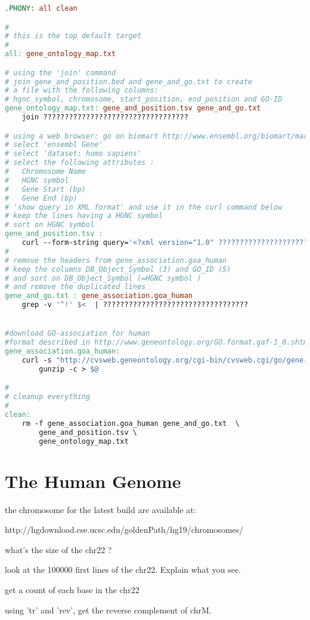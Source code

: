 \documentclass{article}
\begin{document}
\begin{lstlisting}[language=make]
.PHONY: all clean

#
# this is the top default target
#
all: gene_ontology_map.txt

# using the 'join' command
# join gene_and_position.bed and gene_and_go.txt to create 
# a file with the following columns:  
# hgnc_symbol, chromosome, start_position, end_position and GO-ID
gene_ontology_map.txt: gene_and_position.tsv gene_and_go.txt
	join ??????????????????????????????????

# using a web browser: go on biomart http://www.ensembl.org/biomart/martview/
# select 'ensembl Gene'
# select 'dataset: homo sapiens'
# select the following attributes : 
#	Chromosome Name
#	HGNC symbol 
#	Gene Start (bp)
#	Gene End (bp)
# 'show query in XML format' and use it in the curl command below
# keep the lines having a HGNC symbol
# sort on HGNC symbol 
gene_and_position.tsv : 
	curl --form-string query='<?xml version="1.0" ??????????????????????????????????
#
# remove the headers from gene_association.goa_human
# keep the columns DB_Object_Symbol (3) and GO_ID (5)
# and sort on DB_Object_Symbol (=HGNC symbol )
# and remove the duplicated lines
gene_and_go.txt : gene_association.goa_human
	grep -v '^!' $<  | ??????????????????????????????????


#download GO-association for human
#format described in http://www.geneontology.org/GO.format.gaf-1_0.shtml
gene_association.goa_human:
	curl -s "http://cvsweb.geneontology.org/cgi-bin/cvsweb.cgi/go/gene-associations/$@.gz?rev=HEAD" |\
		gunzip -c > $@

#
# cleanup everything
#
clean:
	rm -f gene_association.goa_human gene_and_go.txt  \
		gene_and_position.tsv \
		gene_ontology_map.txt
\end{lstlisting}


\section{The Human Genome}

the chromosome for the latest build are available at:

http://hgdownload.cse.ucsc.edu/goldenPath/hg19/chromosomes/

what's the size of the chr22 ?

look at the 100000 first lines of the chr22. Explain what you see.

get a count of each base in the chr22

using 'tr' and 'rev', get the reverse complement of chrM.
\end{document}
